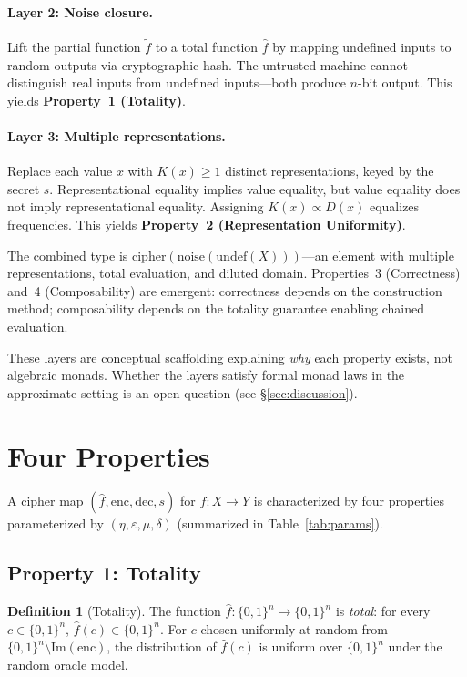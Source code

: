 \documentclass[11pt]{article}
\theoremstyle{definition}
\newtheorem{definition}{Definition}[section]
\theoremstyle{plain}
\theoremstyle{remark}
\newcommand{\fhat}{\hat{f}}
\newcommand{\enc}{\mathrm{enc}}
\newcommand{\dec}{\mathrm{dec}}
\newcommand{\im}{\mathrm{Im}}
\begin{document}
\paragraph{Layer 2: Noise closure.}
Lift the partial function $\tilde{f}$ to a total function $\fhat$ by
mapping undefined inputs to random outputs via cryptographic hash.  The
untrusted machine cannot distinguish real inputs from undefined
inputs---both produce $n$-bit output.  This yields \textbf{Property~1
(Totality)}.

\paragraph{Layer 3: Multiple representations.}
Replace each value $x$ with $K(x) \geq 1$ distinct representations, keyed
by the secret $s$.  Representational equality implies value equality, but
value equality does not imply representational equality.  Assigning
$K(x) \propto D(x)$ equalizes frequencies.  This yields
\textbf{Property~2 (Representation Uniformity)}.

\medskip

The combined type is
$\mathrm{cipher}(\mathrm{noise}(\mathrm{undef}(X)))$---an element with
multiple representations, total evaluation, and diluted domain.
Properties~3 (Correctness) and~4 (Composability) are emergent: correctness
depends on the construction method; composability depends on the totality
guarantee enabling chained evaluation.

These layers are conceptual scaffolding explaining \emph{why} each property
exists, not algebraic monads.  Whether the layers satisfy formal monad
laws in the approximate setting is an open question (see \S\ref{sec:discussion}).


\section{Four Properties}
\label{sec:properties}

A cipher map $(\fhat, \enc, \dec, s)$ for $f : X \to Y$ is characterized by
four properties parameterized by $(\eta, \varepsilon, \mu, \delta)$
(summarized in Table~\ref{tab:params}).

\subsection{Property 1: Totality}

\begin{definition}[Totality]
\label{def:totality}
The function $\fhat : \{0,1\}^n \to \{0,1\}^n$ is \emph{total}: for every
$c \in \{0,1\}^n$, $\fhat(c) \in \{0,1\}^n$.  For $c$ chosen uniformly at
random from $\{0,1\}^n \setminus \im(\enc)$, the distribution of $\fhat(c)$
is uniform over $\{0,1\}^n$ under the random oracle model.
\end{definition}
\end{document}
